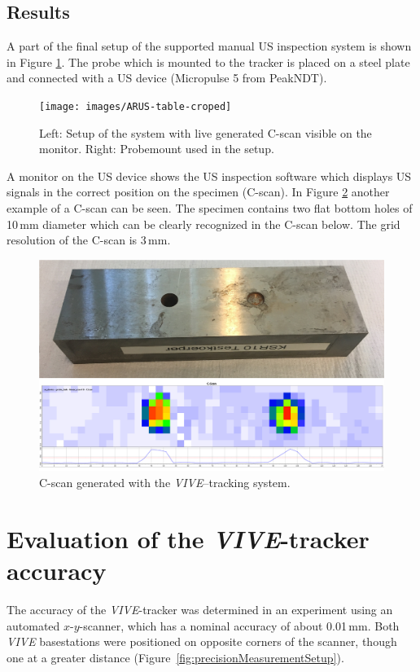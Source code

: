 \documentclass{VRARWorkshop}
\begin{document}
\subsection{Results}
A part of the final setup of the supported manual US inspection system is shown in Figure \ref{fig:AR-table}. 
The probe which is mounted to the tracker is placed on a steel plate and connected with a US device (Micropulse 5 from PeakNDT). 
\begin{figure}[h!]
    \begin{center}
        \texttt{[image: images/ARUS-table-croped]}
        \caption{\label{fig:AR-table} Left: Setup of the system with live generated C-scan visible on the monitor. Right: Probemount used in the setup.}
    \end{center}
\end{figure}
A monitor on the US device shows the US inspection software which displays US signals in the correct position on the specimen (C-scan).
In Figure \ref{fig:resultCScan} another example of a C-scan can be seen. 
The specimen contains two flat bottom holes of 10\,mm diameter which can be clearly recognized in the C-scan below. 
The grid resolution of the C-scan is 3\,mm.
\begin{figure}[h!]
    \begin{center}
        \includegraphics[width=120mm]{images/CScanARUS}
        \caption{\label{fig:resultCScan} C-scan generated with the \textit{VIVE}--tracking system.}
    \end{center}
\end{figure}

\section{Evaluation of the \textit{VIVE}-tracker accuracy}
The accuracy of the \textit{VIVE}-tracker was determined in an experiment using an automated $x$-$y$-scanner, which has a nominal accuracy of about 0.01\,mm.
Both \textit{VIVE} basestations were positioned on opposite corners of the scanner, though one at a greater distance (Figure~\ref{fig:precisionMeasurementSetup}).
\end{document}
